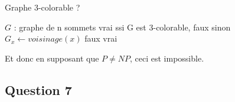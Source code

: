 \begin{center}
\begin{algorithm}[H]
\caption{Graphe 3-colorable ?}\label{ex16_algo2}
\begin{algorithmic}[1]
\REQUIRE $G$ : graphe de n sommets
\ENSURE vrai ssi G est 3-colorable, faux sinon  
		\STATE $G_x \leftarrow voisinage(x)$
			\RETURN faux
		\ENDIF
	\ENDFOR
	\RETURN vrai
\end{algorithmic}
\end{algorithm}
\end{center}

Et donc en supposant que $P \neq NP$, ceci est impossible.

\subsection{Question 7}\label{ex16_q7}

